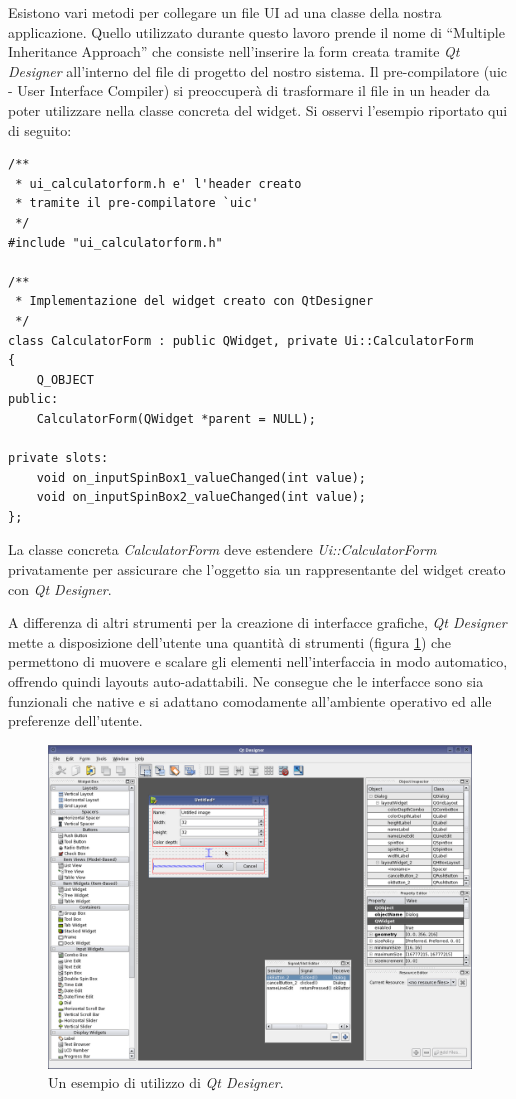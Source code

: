 Esistono vari metodi per collegare un file UI ad una classe della nostra applicazione. Quello utilizzato durante questo lavoro prende il nome di ``Multiple Inheritance Approach'' che consiste nell'inserire la form creata tramite \emph{Qt Designer} all'interno del file di progetto del nostro sistema. Il pre-compilatore (uic - User Interface Compiler) si preoccuperà di trasformare il file \xml{} in un header \cpp{} da poter utilizzare nella classe concreta del widget. Si osservi l'esempio riportato qui di seguito:
\begin{lstlisting}
/**
 * ui_calculatorform.h e' l'header creato
 * tramite il pre-compilatore `uic'
 */
#include "ui_calculatorform.h"

/**
 * Implementazione del widget creato con QtDesigner
 */
class CalculatorForm : public QWidget, private Ui::CalculatorForm
{
    Q_OBJECT
public:
    CalculatorForm(QWidget *parent = NULL);

private slots:
    void on_inputSpinBox1_valueChanged(int value);
    void on_inputSpinBox2_valueChanged(int value);
};
\end{lstlisting}
La classe concreta \emph{CalculatorForm} deve estendere \emph{Ui::CalculatorForm} privatamente per assicurare che l'oggetto sia un rappresentante del widget creato con \emph{Qt Designer}.

A differenza di altri strumenti per la creazione di interfacce grafiche, \emph{Qt Designer} mette a disposizione dell'utente una quantità di strumenti (figura \ref{figura:qtdesigner}) che permettono di muovere e scalare gli elementi nell'interfaccia in modo automatico, offrendo quindi layouts auto-adattabili. Ne consegue che le interfacce sono sia funzionali che native e si adattano comodamente all'ambiente operativo ed alle preferenze dell'utente.

\begin{figure}[!htb]
	\centering
	\includegraphics[width=12cm]{images/qtdesigner.png}
	\caption{Un esempio di utilizzo di \emph{Qt Designer}.}
	\label{figura:qtdesigner}
\end{figure}


